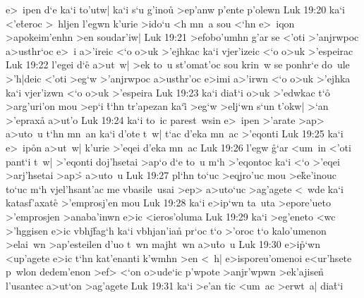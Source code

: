 e>~ipen
d`e
ka`i
to'utw|
ka`i
s`u
g'inou\r{}
>ep'anw
p'ente
p'olewn\bibvsend
\vs Luk 19:20
ka`i
<'e\r{t}eroc
>~hljen
l'egwn
k'urie
>ido`u
<h
mn~a
sou
<`hn
e>~iqon
>apokeim'enhn
>en
soudar'iw|\bibvsend
\vs Luk 19:21
>efobo'umhn
g'ar
se
<'oti
>'anjrwpoc
a>usthr`oc
e>~i
a>'ireic
<`o
o>uk
>'ejhkac
ka`i
vjer'izeic
<`o
o>uk
>'espeirac\bibvsend
\vs Luk 19:22
l'egei
d`e\r{}
a>ut~w|
>ek
to~u
st'omat'oc
sou
krin~w
se
ponhr`e
do~ule
>'h|deic
<'oti
>eg`w
>'anjrwpoc
a>usthr'oc
e>imi
a>'irwn
<`o
o>uk
>'ejhka
ka`i
vjer'izwn
<`o
o>uk
>'espeira\bibvsend
\vs Luk 19:23
ka`i
dia\r{t}`i
o>uk
>'edwkac
t`o\r{}
>arg'uri'on
mou
>ep`i
\r{t}`hn
tr'apezan
ka`i\r{}
>eg`w
>elj`wn
s`un
t'okw|
>`an
>'epraxa\r{}
a>ut'o\bibvsend
\vs Luk 19:24
ka`i
to~ic
parest~wsin
e>~ipen
>'arate
>ap>
a>uto~u
t`hn
mn~an
ka`i
d'ote
t~w|
t`ac
d'eka
mn~ac
>'eqonti\bibvsend
\vs Luk 19:25
ka`i
e>~ip\r{o}n
a>ut~w|
k'urie
>'eqei
d'eka
mn~ac\bibvsend
\vs Luk 19:26
l'egw
\r{g}`ar
<um~in
<'oti
pant`i
t~w|
>'eqonti
doj'hsetai
>ap`o
d`e
to~u
m`h
>'eqontoc
ka`i
<`o
>'eqei
>arj'hsetai
>ap>\r{}
a>uto~u\bibvsend
\vs Luk 19:27
pl`hn
to`uc
>eqjro'uc
mou
>e\r{k}e'inouc
to`uc
m`h
vjel'hsant'ac
me
vbasile~usai
>ep>
a>uto`uc
>ag'agete
<~wde
ka`i
katasf'axat\r{e}
>'emprosj'en
mou\bibvsend
\vs Luk 19:28
ka`i
e>ip`wn
ta~uta
>epore'ueto
>'emprosjen
>anaba'inwn
e>ic
<ieros'oluma\bibvsend
\vs Luk 19:29
ka`i
>eg'eneto
<wc
>'hggisen
e>ic
vbhj\r{f}ag`h
ka`i
vbhjan'ia\r{n}
pr`oc
t`o
>'oroc
t`o
kalo'umenon
>elai~wn
>ap'esteilen
d'uo
t~wn
majht~wn
a>u\r{t}o~u\bibvsend
{}
\vs Luk 19:30
e>i\r{p}`wn
<up'agete
e>ic
t`hn
kat'enanti
k'wmhn
>en
<~h|
e>isporeu'omenoi
e<ur'hsete
p~wlon
dedem'enon
>ef>
<`on
o>ude`ic
p'wpote
>anjr'wpwn
>ek'ajise\r{n}
l'usantec
a>ut`on
>ag'agete\bibvsend
\vs Luk 19:31
ka`i
>e'an
tic
<um~ac
>erwt~a|
dia\r{t}`i
